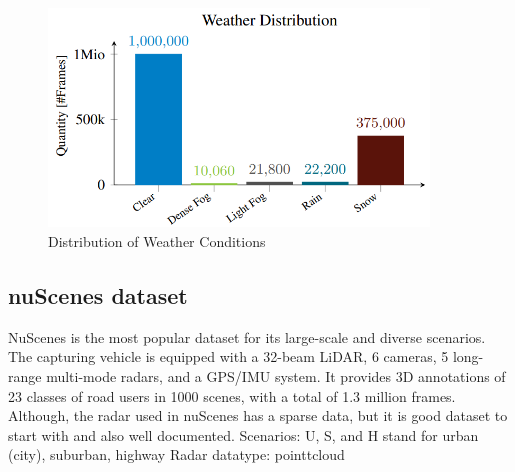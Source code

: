 \documentclass[report.tex]{subfiles}
\begin{document}
        \begin{figure}[h]
                \centering
                \includegraphics[width=0.9\textwidth]{images/datasets/dense/distribution_of_weather_conditions.png}
                \caption{Distribution of Weather Conditions \cite{bijelic2020seeing}}
                \label{fig:dense_distribution_of_weather_conditions}
        \end{figure}


    \subsection{nuScenes dataset \cite{caesar2020nuscenes}}

    NuScenes \cite{caesar2020nuscenes} is the most popular dataset for its large-scale and diverse scenarios. The capturing vehicle is equipped with a 32-beam LiDAR, 6 cameras, 5 long-range multi-mode radars, and a GPS/IMU system. It provides 3D annotations of 23 classes of road users in 1000 scenes, with a total of 1.3 million frames. Although, the radar used in nuScenes has a sparse data, but it is good dataset to start with and also well documented.
    Scenarios: U, S, and H stand for urban (city), suburban, highway
    Radar datatype: pointtcloud
\end{document}
